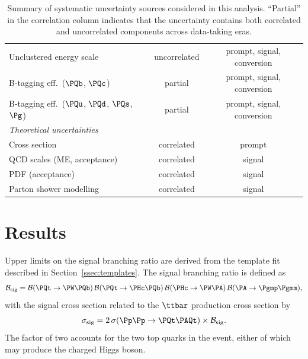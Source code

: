 \begin{table}[htbp]
\begin{tabular}{lcc}
    Unclustered energy scale               & uncorrelated     & prompt, signal, conversion \\
    B-tagging eff.\ ($\PQb$, $\PQc$)      & partial          & prompt, signal, conversion \\
    B-tagging eff.\ ($\PQu$, $\PQd$, $\PQs$, $\Pg$) & partial & prompt, signal, conversion \\
    \hline
    \multicolumn{3}{l}{\textit{Theoretical uncertainties}} \\
    Cross section                          & correlated       & prompt \\
    QCD scales (ME, acceptance)            & correlated       & signal \\
    PDF (acceptance)                       & correlated       & signal \\
    Parton shower modelling                & correlated       & signal \\
    \hline
  \end{tabular}
  \caption{Summary of systematic uncertainty sources considered in this analysis. ``Partial'' in the correlation column indicates that the uncertainty contains both correlated and uncorrelated components across data-taking eras.}
  \label{tab:syst_summary}
\end{table}

\section{Results}
\label{sec:results}

Upper limits on the signal branching ratio are derived from the template fit described in Section~\ref{ssec:templates}. The signal branching ratio is defined as
\begin{equation}
  \mathcal{B}_{\mathrm{sig}} = \mathcal{B}(\PQt \to \PW\PQb)\,\mathcal{B}(\PQt \to \PHc\PQb)\,\mathcal{B}(\PHc \to \PW\PA)\,\mathcal{B}(\PA \to \Pgmp\Pgmm),
  \label{eq:signal_br}
\end{equation}
with the signal cross section related to the $\ttbar$ production cross section by
\begin{equation}
  \sigma_{\mathrm{sig}} = 2\,\sigma(\Pp\Pp \to \PQt\PAQt) \times \mathcal{B}_{\mathrm{sig}}.
  \label{eq:signal_xsec}
\end{equation}
The factor of two accounts for the two top quarks in the event, either of which may produce the charged Higgs boson.

